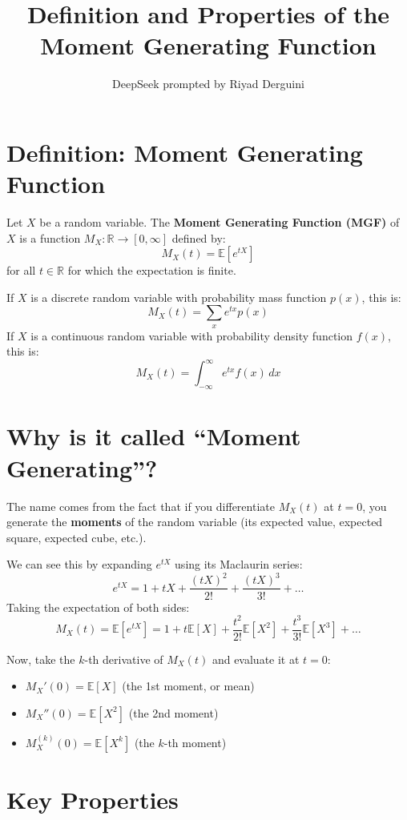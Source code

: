 \documentclass[11pt]{article}
\title{Definition and Properties of the Moment Generating Function}
\author{DeepSeek prompted by Riyad Derguini}
\date{}
\begin{document}
\maketitle

\section{Definition: Moment Generating Function}

Let \(X\) be a random variable. The \textbf{Moment Generating Function (MGF)} of \(X\) is a function \(M_X : \mathbb{R} \to [0, \infty]\) defined by:
\[
 M_X(t) = \mathbb{E}[e^{tX}] 
\]
for all \(t \in \mathbb{R}\) for which the expectation is finite. 

If \(X\) is a discrete random variable with probability mass function \(p(x)\), this is:
\[
 M_X(t) = \sum_x e^{tx} p(x) 
\]
If \(X\) is a continuous random variable with probability density function \(f(x)\), this is:
\[
 M_X(t) = \int_{-\infty}^{\infty} e^{tx} f(x) \, dx 
\]

\hrulefill

\section{Why is it called ``Moment Generating''?}

The name comes from the fact that if you differentiate \(M_X(t)\) at \(t = 0\), you generate the \textbf{moments} of the random variable (its expected value, expected square, expected cube, etc.).

We can see this by expanding \(e^{tX}\) using its Maclaurin series:
\[
 e^{tX} = 1 + tX + \frac{(tX)^2}{2!} + \frac{(tX)^3}{3!} + \dots 
\]
Taking the expectation of both sides:
\[
 M_X(t) = \mathbb{E}[e^{tX}] = 1 + t\mathbb{E}[X] + \frac{t^2}{2!}\mathbb{E}[X^2] + \frac{t^3}{3!}\mathbb{E}[X^3] + \dots 
\]

Now, take the \(k\)-th derivative of \(M_X(t)\) and evaluate it at \(t=0\):
\begin{itemize}
    \item \(M_X'(0) = \mathbb{E}[X]\) (the 1st moment, or mean)
    \item \(M_X''(0) = \mathbb{E}[X^2]\) (the 2nd moment)
    \item \(M_X^{(k)}(0) = \mathbb{E}[X^k]\) (the \(k\)-th moment)
\end{itemize}

\hrulefill

\section{Key Properties}
\end{document}
